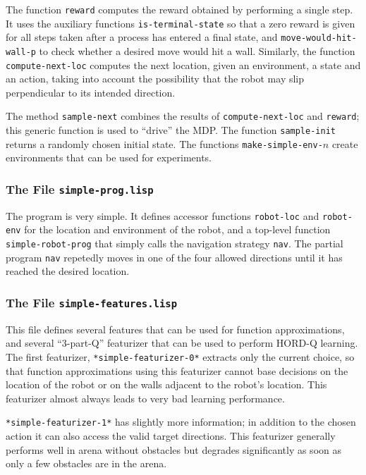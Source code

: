 \documentclass[a4paper]{amsart}
\begin{document}
The function \texttt{reward} computes the reward obtained by
performing a single step.  It uses the auxiliary functions
\texttt{is-terminal-state} so that a zero reward is given for all
steps taken after a process has entered a final state, and
\texttt{move-would-hit-wall-p} to check whether a desired move would
hit a wall.  Similarly, the function \texttt{compute-next-loc}
computes the next location, given an environment, a state and an
action, taking into account the possibility that the robot may slip
perpendicular to its intended direction.

The method \texttt{sample-next} combines the results of
\texttt{compute-next-loc} and \texttt{reward}; this generic function
is used to ``drive'' the MDP.  The function \texttt{sample-init}
returns a randomly chosen initial state.  The functions
\texttt{make-simple-env-}$n$ create environments that can be used for
experiments.

\subsubsection{The File \texttt{simple-prog.lisp}}
\label{sec:file-simple-prog.lisp}

The program is very simple.  It defines accessor functions
\texttt{robot-loc} and \texttt{robot-env} for the location and
environment of the robot, and a top-level function
\texttt{simple-robot-prog} that simply calls the navigation strategy
\texttt{nav}.  The partial program \texttt{nav} repetedly moves in one
of the four allowed directions until it has reached the desired
location.


\subsubsection{The File \texttt{simple-features.lisp}}
\label{sec:file-simple-features.lisp}

This file defines several features that can be used for function
approximations, and several ``3-part-Q'' featurizer that can be used
to perform HORD-Q learning.  The first featurizer,
\texttt{*simple-featurizer-0*} extracts only the current choice, so
that function approximations using this featurizer cannot base
decisions on the location of the robot or on the walls adjacent to the
robot's location.  This featurizer almost always leads to very bad
learning performance.

\texttt{*simple-featurizer-1*} has slightly more information; in
addition to the chosen action it can also access the valid target
directions.  This featurizer generally performs well in arena without
obstacles but degrades significantly as soon as only a few obstacles
are in the arena.
\end{document}
